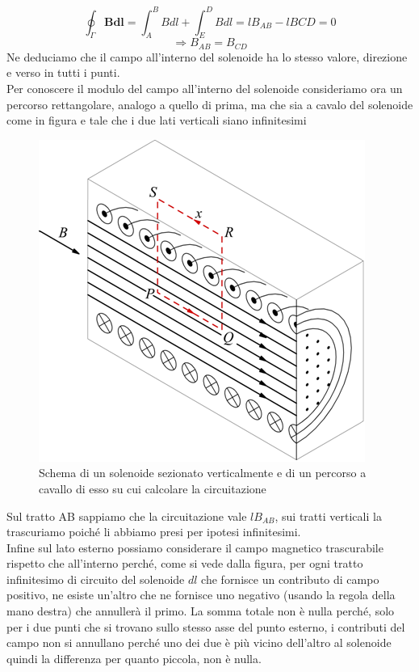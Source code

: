 \documentclass[
10pt, %
a4paper, %
oneside, %
headinclude,footinclude, %
BCOR5mm, %
]{scrartcl}
\begin{document}
\[\oint_{\Gamma}\mathbf{B}\mathbf{dl}= \int_{A}^{B}Bdl+\int_{E}^{D}Bdl=lB_{AB}-lB{CD}=0\]
\[\Rightarrow B_{AB}=B_{CD}\]
Ne deduciamo che il campo all'interno del solenoide ha lo stesso valore, direzione e verso in tutti i punti.\\
Per conoscere il modulo del campo all'interno del solenoide consideriamo ora un percorso rettangolare, analogo a quello di prima, ma che sia a cavalo del solenoide come in figura e tale che i due lati verticali siano infinitesimi
\begin{figure}[h!]
	\centering
	\includegraphics[width=0.6\linewidth]{../images/circuitazione_solenoide}
	\caption{Schema di un solenoide sezionato verticalmente e di un percorso a cavallo di esso su cui calcolare la circuitazione}
	\label{fig:circuitazionesolenoide}
\end{figure}
\FloatBarrier
Sul tratto AB sappiamo che la circuitazione vale \(lB_{AB}\), sui tratti verticali la trascuriamo poiché li abbiamo presi per ipotesi infinitesimi.\\ Infine sul lato esterno possiamo considerare il campo magnetico trascurabile rispetto che all'interno perché, come si vede dalla figura, per ogni tratto infinitesimo di circuito del solenoide \(dl\) che fornisce un contributo di campo positivo, ne esiste un'altro che ne fornisce uno negativo (usando la regola della mano destra) che annullerà il primo. La somma totale non è nulla perché, solo per i due punti che si trovano sullo stesso asse del punto esterno, i contributi del campo non si annullano perché uno dei due è più vicino dell'altro al solenoide quindi la differenza per quanto piccola, non è nulla. 
\end{document}
